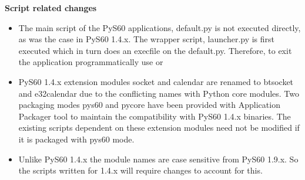 {\bf Script related changes} \break

\begin{itemize}
\item The main script of the PyS60 applications, default.py is not executed directly,
      as was the case in PyS60 1.4.x. The wrapper script, launcher.py is first
      executed which in turn does an execfile on the default.py. Therefore, to exit
      the application programmatically use  or

\item PyS60 1.4.x extension modules socket and calendar are renamed to btsocket and
      e32calendar due to the conflicting names with Python core modules. Two
      packaging modes pys60 and pycore have been provided with Application Packager
      tool to maintain the compatibility with PyS60 1.4.x binaries. The existing scripts
      dependent on these extension modules need not be modified if it is packaged
      with pys60 mode.

\item Unlike PyS60 1.4.x the module names are case sensitive from PyS60 1.9.x. So
      the scripts written for 1.4.x will require changes to account for this.
\end{itemize}
